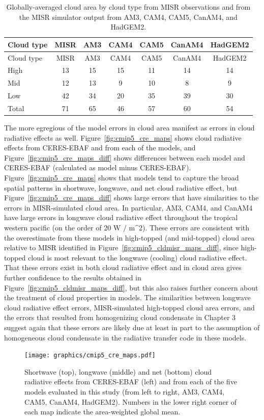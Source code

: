 \begin{longtable}[]{@{}lcccccc@{}}
\caption{\label{tbl:cmip5_cldmisr}Globally-averaged cloud area by cloud
type from MISR observations and from the MISR simulator output from AM3,
CAM4, CAM5, CanAM4, and HadGEM2. }\tabularnewline
\toprule
Cloud type & MISR & AM3 & CAM4 & CAM5 & CanAM4 & HadGEM2\tabularnewline
\midrule
\endfirsthead
\toprule
Cloud type & MISR & AM3 & CAM4 & CAM5 & CanAM4 & HadGEM2\tabularnewline
\midrule
\endhead
High & 13 & 15 & 15 & 11 & 14 & 14\tabularnewline
Mid & 12 & 13 & 9 & 10 & 8 & 9\tabularnewline
Low & 42 & 34 & 20 & 35 & 39 & 30\tabularnewline
Total & 71 & 65 & 46 & 57 & 60 & 54\tabularnewline
\bottomrule
\end{longtable}

The more egregious of the model errors in cloud area manifest as errors
in cloud radiative effects as well. Figure~\ref{fig:cmip5_cre_maps}
shows cloud radiative effects from CERES-EBAF and from each of the
models, and Figure~\ref{fig:cmip5_cre_maps_diff} shows differences
between each model and CERES-EBAF (calculated as model minus
CERES-EBAF). Figure~\ref{fig:cmip5_cre_maps} shows that models tend to
capture the broad spatial patterns in shortwave, longwave, and net cloud
radiative effect, but Figure~\ref{fig:cmip5_cre_maps_diff} shows large
errors that have similarities to the errors in MISR-simulated cloud
area. In particular, AM3, CAM4, and CanAM4 have large errors in longwave
cloud radiative effect throughout the tropical western pacific (on the
order of 20 \(\textrm{W / m^2}\)). These errors are consistent with the
overestimate from these models in high-topped (and mid-topped) cloud
area relative to MISR identified in
Figure~\ref{fig:cmip5_cldmisr_maps_diff}, since high-topped cloud is
most relevant to the longwave (cooling) cloud radiative effect. That
these errors exist in both cloud radiative effect and in cloud area
gives further confidence to the results obtained in
Figure~\ref{fig:cmip5_cldmisr_maps_diff}, but this also raises further
concern about the treatment of cloud properties in models. The
similarities between longwave cloud radiative effect errors,
MISR-simulated high-topped cloud area errors, and the errors that
resulted from homogenizing cloud condensate in Chapter 3 suggest again
that these errors are likely due at least in part to the assumption of
homogeneous cloud condensate in the radiative transfer code in these
models.

\begin{figure}[htbp]
\centering
\texttt{[image: graphics/cmip5\_cre\_maps.pdf]}
\caption{\label{fig:cmip5_cre_maps}Shortwave (top), longwave (middle)
and net (bottom) cloud radiative effects from CERES-EBAF (left) and from
each of the five models evaluated in this study (from left to right,
AM3, CAM4, CAM5, CanAM4, HadGEM2). Numbers in the lower right corner of
each map indicate the area-weighted global
mean.}\label{fig:cmip5ux5fcreux5fmaps}
\end{figure}


